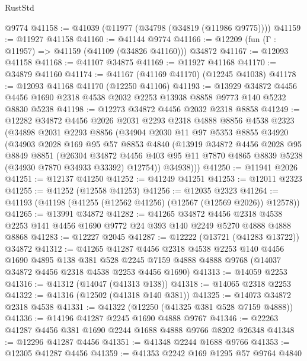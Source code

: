 \begin{lexlean}{RustStd}
\begin{coremodule}
    @9774
@41158 := @41039 (@11977 (@34798 (@34819 (@11986 @9775))))
@41159 := @11927 @41158
@41160 := @41144 @9774
@41166 := @12209 (fun (Γ : @11957) => @41159 (@41109 (@34826 @41160))) @34872
@41167 := @12093 @41158
@41168 := @41107 @34875
@41169 := @11927 @41168
@41170 := @34879 @41160
@41174 := @41167 (@41169 @41170) (@12245 @41038)
@41178 := @12093 @41168 @41170 (@12250 @41106)
@41193 := @13929
    @34872
    @4456
    @4456
    @1690
    @2318
    @4538
    @2032
    @2253
    @13938
    @8858
    @9773
    @140
    @5232
    @8830
    @5238
@41198 := @12273 @34872 @4456 @2032 @2318 @8858
@41249 := @12282
    @34872
    @4456
    @2026
    @2031
    @2293
    @2318
    @4888
    @8856
    @4538
    @2323
    (@34898
      @2031
      @2293
      @8856
      (@34904
        @2030
        @11
        @97
        @5353
        @8855
        @34920
        (@34903
          @2028
          @169
          @95
          @57
          @8853
          @4840
          (@13919
            @34872
            @4456
            @2028
            @95
            @8849
            @8851
            (@26304
              @34872
              @4456
              @403
              @95
              @11
              @7870
              @4865
              @8839
              @5238
              (@34930 @7870 @34933 @33392)
              @12754))
          @34938)))
@41250 := @11941 @2026
@41251 := @12137 @41250
@41252 := @41249 @41251
@41253 := @12011 @2323
@41255 := @41252 (@12558 @41253)
@41256 := @12035 @2323
@41264 := @41193 (@41198 (@41255 (@12562 @41256) (@12567 (@12569 @2026)) @12578))
@41265 := @13991 @34872
@41282 := @41265
    @34872
    @4456
    @2318
    @4538
    @2253
    @141
    @4456
    @1690
    @9772
    @24
    @393
    @140
    @2249
    @5270
    @4888
    @4888
    @8868
@41283 := @12227 @2045
@41287 := @12222 (@13721 (@41283 @13722)) @34872
@41312 := @41265
    @41287
    @4456
    @2318
    @4538
    @2253
    @140
    @4456
    @1690
    @4895
    @138
    @381
    @528
    @2245
    @7159
    @4888
    @4888
    @9768
    (@14037 @34872 @4456 @2318 @4538 @2253 @4456 @1690)
@41313 := @14059 @2253
@41316 := @41312 (@14047 (@41313 @138))
@41318 := @14065 @2318 @2253
@41322 := @41316 (@12502 (@41318 @140 @381))
@41325 := @14073 @34872 @2318 @4538
@41331 := @41322 (@12250 (@41325 @381 @528 @7159 @4888))
@41336 := @14196 @41287 @2245 @1690 @4888 @9767
@41346 := @22263 @41287 @4456 @381 @1690 @2244 @1688 @4888 @9766 @8202 @26348
@41348 := @12296 @41287 @4456
@41351 := @41348 @2244 @1688 @9766
@41353 := @12305 @41287 @4456
@41359 := @41353 @2242 @169 @1295 @57 @9764 @4840

\end{coremodule}
\end{lexlean}
